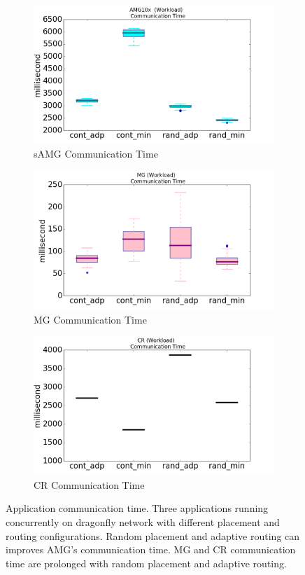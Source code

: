 \documentclass[conference,compsoc]{IEEEtran}
\begin{document}
\begin{figure}[t!]
    \centering
    \begin{subfigure}[t]{0.32\textwidth}
        \centering
        \includegraphics[height=1.5 in]{syn-wkld/amg10/commtime}
        \caption{sAMG Communication Time}
        \label{fig:samg-commtime}
    \end{subfigure}%
    \hspace{1em}%
    \begin{subfigure}[t]{0.32\textwidth}
        \centering
        \includegraphics[height=1.5 in]{syn-wkld/mg/commtime}
        \caption{MG Communication Time}
        \label{fig:syn-mg-commtime}
    \end{subfigure}%
    \begin{subfigure}[t]{0.32\textwidth}
        \centering
        \includegraphics[height=1.5 in]{syn-wkld/cr/commtime}
        \caption{CR Communication Time}
        \label{fig:syn-cr-commtime}
    \end{subfigure}%
   \caption{Application communication time. Three applications running concurrently on dragonfly network with different placement and routing configurations. Random placement and adaptive routing can improves AMG's communication time. MG and CR communication time are prolonged with random placement and adaptive routing.}
   \label{fig:syn-apps-commtime}
\end{figure}
\end{document}
